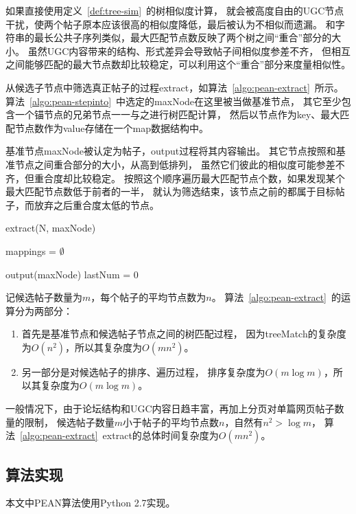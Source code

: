 如果直接使用定义~\ref{def:tree-sim}~的树相似度计算，
就会被高度自由的UGC节点干扰，使两个帖子原本应该很高的相似度降低，最后被认为不相似而遗漏。
和字符串的最长公共子序列类似，最大匹配节点数反映了两个树之间“重合”部分的大小。
虽然UGC内容带来的结构、形式差异会导致帖子间相似度参差不齐，
但相互之间能够匹配的最大节点数却比较稳定，可以利用这个“重合”部分来度量相似性。

从候选子节点中筛选真正帖子的过程extract，如算法~\ref{algo:pean-extract}~所示。
算法~\ref{algo:pean-stepinto}~中选定的maxNode在这里被当做基准节点，
其它至少包含一个锚节点的兄弟节点一一与之进行树匹配计算，
然后以节点作为key、最大匹配节点数作为value存储在一个map数据结构中。

基准节点maxNode被认定为帖子，output过程将其内容输出。
其它节点按照和基准节点之间重合部分的大小，从高到低排列，
虽然它们彼此的相似度可能参差不齐，但重合度却比较稳定。
按照这个顺序遍历最大匹配节点个数，如果发现某个最大匹配节点数低于前者的一半，
就认为筛选结束，该节点之前的都属于目标帖子，而放弃之后重合度太低的节点。

\begin{algorithm}[htbp]
\caption{extract(N, maxNode)}
\label{algo:pean-extract}

mappings = $\emptyset$ \;

output(maxNode) \;
lastNum = 0 \;
\end{algorithm}

记候选帖子数量为$m$，每个帖子的平均节点数为$n$。
算法~\ref{algo:pean-extract}~的运算分为两部分：
\begin{enumerate}
\item 首先是基准节点和候选帖子节点之间的树匹配过程，
因为treeMatch的复杂度为$O(n^2)$，所以其复杂度为$O(mn^2)$。
\item 另一部分是对候选帖子的排序、遍历过程，
排序复杂度为$O(m\log m)$，所以其复杂度为$O(m\log m)$。
\end{enumerate}

一般情况下，由于论坛结构和UGC内容日趋丰富，再加上分页对单篇网页帖子数量的限制，
候选帖子数量$m$小于帖子的平均节点数$n$，自然有$n^2 > \log m$，
算法~\ref{algo:pean-extract}~extract的总体时间复杂度为$O(mn^2)$。

\subsection{算法实现}
本文中PEAN算法使用Python 2.7实现。


